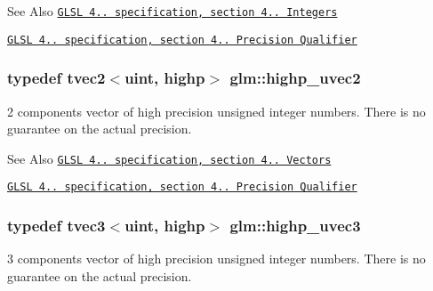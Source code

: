 \begin{DoxySeeAlso}{See Also}
\href{http://www.opengl.org/registry/doc/GLSLangSpec.4.20.8.pdf}{\tt G\-L\-S\-L 4.. specification, section 4.. Integers} 

\href{http://www.opengl.org/registry/doc/GLSLangSpec.4.20.8.pdf}{\tt G\-L\-S\-L 4.. specification, section 4.. Precision Qualifier} 
\end{DoxySeeAlso}
\hypertarget{group__core__precision_ga386eaa1579a0f5ad51cd7d8fcd52ec16}{
\subsubsection[{highp\-\_\-uvec2}]{\setlength{\rightskip}{0pt plus 5cm}typedef tvec2$<$uint, highp$>$ {\bf glm\-::highp\-\_\-uvec2}}}\label{group__core__precision_ga386eaa1579a0f5ad51cd7d8fcd52ec16}
2 components vector of high precision unsigned integer numbers. There is no guarantee on the actual precision.

\begin{DoxySeeAlso}{See Also}
\href{http://www.opengl.org/registry/doc/GLSLangSpec.4.20.8.pdf}{\tt G\-L\-S\-L 4.. specification, section 4.. Vectors} 

\href{http://www.opengl.org/registry/doc/GLSLangSpec.4.20.8.pdf}{\tt G\-L\-S\-L 4.. specification, section 4.. Precision Qualifier} 
\end{DoxySeeAlso}
\hypertarget{group__core__precision_ga90ab9c4694f5af23c7dcd4eb9e47e255}{
\subsubsection[{highp\-\_\-uvec3}]{\setlength{\rightskip}{0pt plus 5cm}typedef tvec3$<$uint, highp$>$ {\bf glm\-::highp\-\_\-uvec3}}}\label{group__core__precision_ga90ab9c4694f5af23c7dcd4eb9e47e255}
3 components vector of high precision unsigned integer numbers. There is no guarantee on the actual precision.

